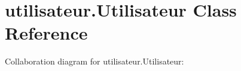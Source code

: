 \hypertarget{classutilisateur_1_1_utilisateur}{}\section{utilisateur.\+Utilisateur Class Reference}
\label{classutilisateur_1_1_utilisateur}


Collaboration diagram for utilisateur.\+Utilisateur\+:
